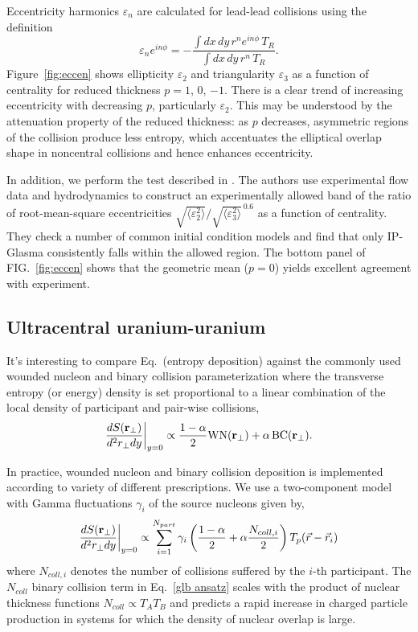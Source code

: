 \documentclass[aps,prl,reprint,amsmath,nofootinbib]{revtex4-1}
\begin{document}
Eccentricity harmonics $\varepsilon_n$ are calculated for lead-lead collisions using the definition
\begin{equation}
  \varepsilon_n e^{i n\phi} = -\frac{\int dx \, dy\, r^n e^{i n \phi} \, T_R}{\int dx \, dy \, r^n \, T_R}.
\end{equation}
Figure~\ref{fig:eccen} shows ellipticity $\varepsilon_2$ and triangularity $\varepsilon_3$ as a
function of centrality for reduced thickness $p = 1$, 0, $-1$.  There is a clear trend of increasing
eccentricity with decreasing $p$, particularly $\varepsilon_2$.  This may be understood by the attenuation
property of the reduced thickness:  as $p$ decreases, asymmetric regions of the collision produce less
entropy, which accentuates the elliptical overlap shape in noncentral collisions and hence enhances eccentricity.

In addition, we perform the test described in \cite{constraining-ic}.  The authors use experimental flow data
and hydrodynamics to construct an experimentally allowed band of the ratio of root-mean-square eccentricities
$\sqrt{\langle \varepsilon_2^2 \rangle}/\sqrt{\langle \varepsilon_3^2 \rangle}^{\,0.6}$ as a function of
centrality.  They check a number of common initial condition models and find that only IP-Glasma consistently
falls within the allowed region.  The bottom panel of FIG.~\ref{fig:eccen} shows that the geometric mean
($p = 0$) yields excellent agreement with experiment.

\subsection{Ultracentral uranium-uranium}

It's interesting to compare Eq.~(entropy deposition) against the commonly used wounded nucleon and
binary collision parameterization where the transverse entropy (or energy) density is set proportional to a
linear combination of the local density of participant and pair-wise collisions,
\begin{equation}
  \label{glb ansatz}
  \frac{dS({\bf r}_\perp)}{d^2r_\perp dy} \biggr \rvert_{y=0} \propto
  \frac{1-\alpha}{2}\mbox{WN}({\bf r_\perp}) + \alpha\, \mbox{BC}({\bf r_\perp}).
\end{equation}

In practice, wounded nucleon and binary collision deposition is implemented according to variety of different
prescriptions. We use a two-component model with Gamma fluctuations $\gamma_i$ of the source nucleons given
by,
\begin{equation}
  \label{glb algorithm}
  \frac{dS({\bf r}_\perp)}{d^2r_\perp dy} \biggr \rvert_{y=0} \propto
  \sum\limits_{i=1}^{N_{part}} \gamma_i \left(\frac{1-\alpha}{2} +
  \alpha \frac{N_{coll,i}}{2} \right ) T_p(\vec{r}-\vec{r}_i)
\end{equation}
where $N_{coll,i}$ denotes the number of collisions suffered by the $i$-th participant. The $N_{coll}$ binary
collision term in Eq.~\eqref{glb ansatz} scales with the product of nuclear thickness functions $N_{coll}
\propto T_A T_B$ and predicts a rapid increase in charged particle production in systems for which the density
of nuclear overlap is large.
\end{document}
